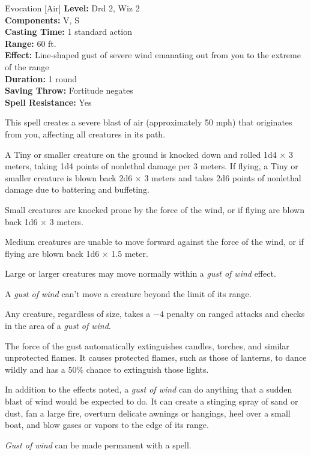 {Evocation [Air]}
{
	\textbf{Level:}
	Drd 2, Wiz 2\\
	\textbf{Components:}
	V, S\\
	\textbf{Casting Time:}
	1 standard action\\
	\textbf{Range:}
	60 ft.\\
	\textbf{Effect:}
	Line-shaped gust of severe wind emanating out from you to the extreme of the range\\
	\textbf{Duration:}
	1 round\\
	\textbf{Saving Throw:}
	Fortitude negates\\
	\textbf{Spell Resistance:}
	Yes\\
}
{
	This spell creates a severe blast of air (approximately 50 mph) that originates from you, affecting all creatures in its path.

	A Tiny or smaller creature on the ground is knocked down and rolled 1d4 $\times$ 3 meters, taking 1d4 points of nonlethal damage per 3 meters. If flying, a Tiny or smaller creature is blown back 2d6 $\times$ 3 meters and takes 2d6 points of nonlethal damage due to battering and buffeting.

	Small creatures are knocked prone by the force of the wind, or if flying are blown back 1d6 $\times$ 3 meters.

	Medium creatures are unable to move forward against the force of the wind, or if flying are blown back 1d6 $\times$ 1.5 meter.

	Large or larger creatures may move normally within a \emph{gust of wind} effect.

	A \emph{gust of wind} can't move a creature beyond the limit of its range.

	Any creature, regardless of size, takes a $-4$ penalty on ranged attacks and  checks in the area of a \emph{gust of wind}.

	The force of the gust automatically extinguishes candles, torches, and similar unprotected flames. It causes protected flames, such as those of lanterns, to dance wildly and has a 50\% chance to extinguish those lights.

	In addition to the effects noted, a \emph{gust of wind} can do anything that a sudden blast of wind would be expected to do. It can create a stinging spray of sand or dust, fan a large fire, overturn delicate awnings or hangings, heel over a small boat, and blow gases or vapors to the edge of its range.

	\emph{Gust of wind} can be made permanent with a  spell.

}
